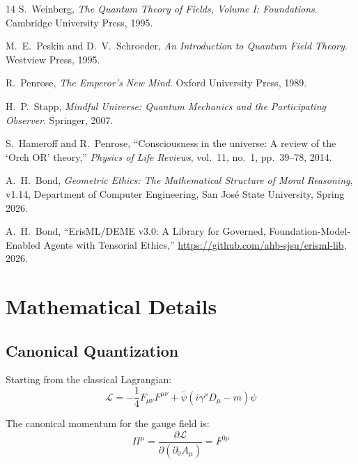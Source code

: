 \documentclass[12pt]{article}
\begin{document}
\begin{thebibliography}{14}
S.~Weinberg, \emph{The Quantum Theory of Fields, Volume I: Foundations}. Cambridge University Press, 1995.

M.~E.~Peskin and D.~V.~Schroeder, \emph{An Introduction to Quantum Field Theory}. Westview Press, 1995.

R.~Penrose, \emph{The Emperor's New Mind}. Oxford University Press, 1989.

H.~P.~Stapp, \emph{Mindful Universe: Quantum Mechanics and the Participating Observer}. Springer, 2007.

S.~Hameroff and R.~Penrose, ``Consciousness in the universe: A review of the `Orch OR' theory,'' \emph{Physics of Life Reviews}, vol.~11, no.~1, pp.~39--78, 2014.

A.~H.~Bond, \emph{Geometric Ethics: The Mathematical Structure of Moral Reasoning}, v1.14, Department of Computer Engineering, San Jos\'e State University, Spring 2026.

A.~H.~Bond, ``ErisML/DEME v3.0: A Library for Governed, Foundation-Model-Enabled Agents with Tensorial Ethics,'' \url{https://github.com/ahb-sjsu/erisml-lib}, 2026.

\end{thebibliography}

\appendix

\section{Mathematical Details}

\subsection{Canonical Quantization}

Starting from the classical Lagrangian:
\begin{equation}
    \mathcal{L} = -\frac{1}{4} F_{\mu\nu} F^{\mu\nu} + \bar{\psi}(i\gamma^\mu D_\mu - m)\psi
\end{equation}

The canonical momentum for the gauge field is:
\begin{equation}
    \Pi^\mu = \frac{\partial \mathcal{L}}{\partial(\partial_0 A_\mu)} = F^{0\mu}
\end{equation}
\end{document}

